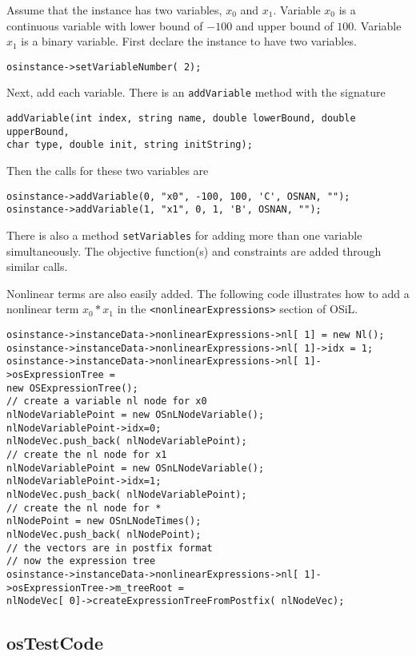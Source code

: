 \documentclass[11pt]{article}
\renewcommand{\_}{{\char"5F}}
\renewcommand{\{}{{\char"7B}}
\renewcommand{\}}{{\char"7D}}
\renewcommand{\^}{{\char"0D}}
\renewcommand{\'}{{\char"0D}}
\begin{document}
Assume that the instance has two variables, $x_{0}$ and $x_{1}.$ Variable $x_{0}$ is a continuous variable with lower bound of $-100$ and upper bound of $100$. Variable $x_{1}$ is a binary variable. First declare the instance to have two variables.
\begin{verbatim}
osinstance->setVariableNumber( 2);
\end{verbatim}
Next, add each variable. There is an {\tt addVariable} method with the signature
\begin{verbatim}
addVariable(int index, string name, double lowerBound, double upperBound,
char type, double init, string initString);
\end{verbatim}
Then the calls for these two variables are
\begin{verbatim}
osinstance->addVariable(0, "x0", -100, 100, 'C', OSNAN, "");
osinstance->addVariable(1, "x1", 0, 1, 'B', OSNAN, "");
\end{verbatim}
There is also a method {\tt setVariables} for adding more than one variable simultaneously.  The objective function(s) and constraints are added through similar calls.

Nonlinear terms are also easily added.  The following code illustrates how to add a nonlinear term $x_{0}*x_{1}$ in the {\tt <nonlinearExpressions>} section of  OSiL.
\begin{verbatim}
osinstance->instanceData->nonlinearExpressions->nl[ 1] = new Nl();
osinstance->instanceData->nonlinearExpressions->nl[ 1]->idx = 1;
osinstance->instanceData->nonlinearExpressions->nl[ 1]->osExpressionTree =
new OSExpressionTree();
// create a variable nl node for x0
nlNodeVariablePoint = new OSnLNodeVariable();
nlNodeVariablePoint->idx=0;
nlNodeVec.push_back( nlNodeVariablePoint);
// create the nl node for x1
nlNodeVariablePoint = new OSnLNodeVariable();
nlNodeVariablePoint->idx=1;
nlNodeVec.push_back( nlNodeVariablePoint);
// create the nl node for *
nlNodePoint = new OSnLNodeTimes();
nlNodeVec.push_back( nlNodePoint);
// the vectors are in postfix format
// now the expression tree
osinstance->instanceData->nonlinearExpressions->nl[ 1]->osExpressionTree->m_treeRoot =
nlNodeVec[ 0]->createExpressionTreeFromPostfix( nlNodeVec);
\end{verbatim}

\subsection{osTestCode}\label{subsection:exampleOSInstanceGeneration}
\end{document}
